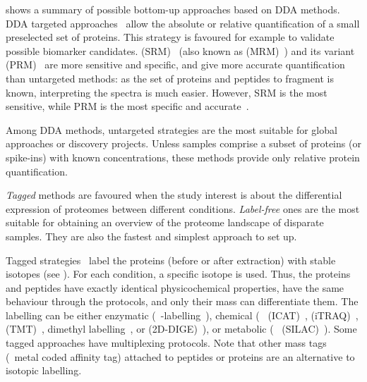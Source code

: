  shows a summary of possible bottom-up approaches
based on \gls{DDA} methods.
\gls{DDA} targeted approaches~ allow
the absolute or relative quantification of a small preselected set of proteins.
This strategy is favoured for example to validate possible biomarker candidates.
 (\gls{SRM})~
(also known as  (\gls{MRM})~)
and its variant  (\gls{PRM})~
are more sensitive and specific, and give more accurate quantification
than untargeted methods:
as the set of proteins and peptides to fragment is known,
interpreting the spectra is much easier.
However, \gls{SRM} is the most sensitive,
while \gls{PRM} is the most specific and accurate~.\mybr\


Among \gls{DDA} methods,
untargeted strategies are the most suitable
for global approaches or discovery projects.
Unless samples comprise a subset of proteins (or spike-ins)
with known concentrations,
these methods provide only relative protein quantification.\mybr\

\emph{Tagged} methods are favoured
when the study interest is about the differential expression of proteomes between
different conditions.
\emph{Label-free} ones are the most suitable for obtaining an overview of
the proteome landscape of disparate samples.
They are also the fastest and simplest approach to set up.\mybr\

Tagged strategies~ label the proteins
(before or after extraction)
with stable isotopes (see ).
For each condition, a specific isotope is used.
Thus, the proteins and peptides
have exactly identical physicochemical properties,
have the same behaviour through the protocols, and
only their mass can differentiate them.
The labelling can be either
enzymatic (\eg\ -labelling~),
chemical (\eg\  (\gls{ICAT})~,
 (\gls{iTRAQ})~,
 (\gls{TMT})~,
dimethyl labelling~,
or  (\gls{2D-DIGE})~),
or metabolic (\eg\  (\gls{SILAC})~).
Some tagged approaches have multiplexing protocols.
Note that other mass tags (\eg\ metal coded affinity tag)
attached to peptides or proteins are an alternative to isotopic labelling.\mybr\


